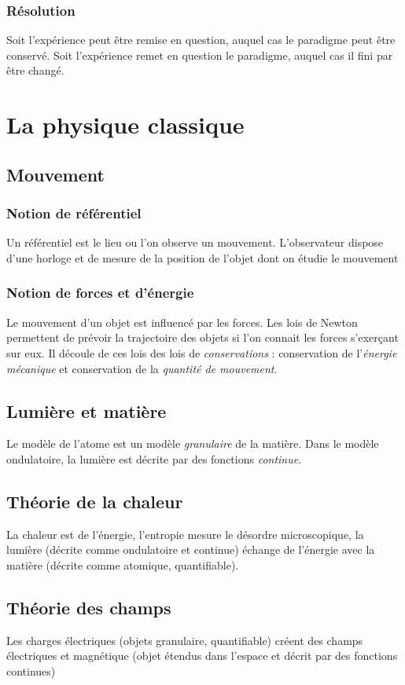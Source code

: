     \subsubsection{Résolution}
Soit l'expérience peut être remise en question, auquel cas le paradigme peut être conservé. Soit l'expérience remet en question le paradigme, auquel cas il fini par être changé.

\section{La physique classique}
  \subsection{Mouvement}
    \subsubsection{Notion de référentiel}
Un référentiel est le lieu ou l'on observe un mouvement. L'observateur dispose d'une horloge et de mesure de la position de l'objet dont on étudie le mouvement
    \subsubsection{Notion de forces et d'énergie}
Le mouvement d'un objet est influencé par les forces. Les lois de Newton permettent de prévoir la trajectoire des objets si l'on connait les forces s'exerçant sur eux.
Il découle de ces lois des lois de {\it conservations} : conservation de l'{\it énergie mécanique} et conservation de la {\it quantité de mouvement}.
  \subsection{Lumière et matière}
Le modèle de l'atome est un modèle {\it granulaire} de la matière. Dans le modèle ondulatoire, la lumière est décrite par des fonctions {\it continue}.

  \subsection{Théorie de la chaleur}
La chaleur est de l'énergie, l'entropie mesure le désordre microscopique, la lumière (décrite comme ondulatoire et continue) échange de l'énergie avec la matière (décrite comme atomique, quantifiable).

  \subsection{Théorie des champs}
Les charges électriques (objets granulaire, quantifiable) créent des champs électriques et magnétique (objet étendus dans l'espace et décrit par des fonctions continues)

